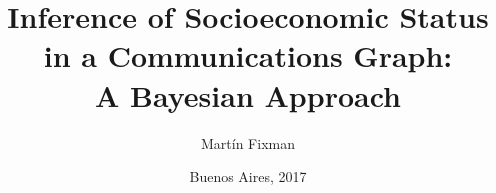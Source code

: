 \documentclass[runningheads, a4paper]{dalthesis/dalthesis}
\title{Inference of Socioeconomic Status in a Communications Graph: \\ A Bayesian Approach}
\author{Martín Fixman}
\date{Buenos Aires, 2017}
\numberwithin{equation}{section}
\begin{document}


\frontmatter

\begin{abstract}
	
\end{abstract}

\mainmatter

















{}
\end{document}
